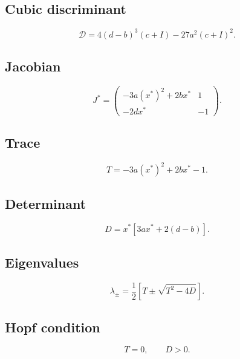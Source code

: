 \documentclass[11pt,a4paper]{article}
\begin{document}
\subsection*{Cubic discriminant}

\begin{equation}
\boxed{
\mathcal{D}
=
4(d-b)^3(c+I)
-
27a^2(c+I)^2.
}
\end{equation}

\subsection*{Jacobian}

\begin{equation}
\boxed{
J^*
=
\begin{pmatrix}
-3a(x^*)^2+2bx^*&1\\
-2dx^*&-1
\end{pmatrix}.
}
\end{equation}

\subsection*{Trace}

\begin{equation}
\boxed{
T
=
-3a(x^*)^2+2bx^*-1.
}
\end{equation}

\subsection*{Determinant}

\begin{equation}
\boxed{
D
=
x^*
\left[
3ax^*+2(d-b)
\right].
}
\end{equation}

\subsection*{Eigenvalues}

\begin{equation}
\boxed{
\lambda_{\pm}
=
\frac12
\left[
T\pm\sqrt{T^2-4D}
\right].
}
\end{equation}

\subsection*{Hopf condition}

\begin{equation}
\boxed{
T=0,\qquad D>0.
}
\end{equation}
\end{document}
